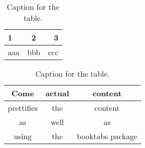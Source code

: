 \documentclass{article}
\begin{document}
\begin{table}[h!]
  \centering
  \caption{Caption for the table.}
  \label{tab:table1}
  \begin{tabular}{|l|c|r|}
	1 & 2 & 3\\
	\hline
	aaa & bbb & ccc
  \end{tabular}
\end{table}

\begin{table}[h!]
  \centering
  \caption{Caption for the table.}
  \label{tab:table2}
  \begin{tabular}{ccc}
	\toprule
	Come & actual & content\\
	\midrule
	prettifies & the & content\\
	as & well & as \\
	using & the & booktabs package\\
	\bottomrule
  \end{tabular}
\end{table}
\end{document}
